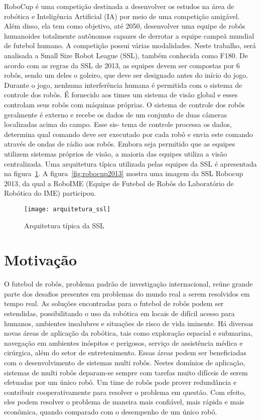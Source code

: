RoboCup é uma competição destinada a desenvolver os estudos na área de robótica
e Inteligência Artificial (IA) por meio de uma competição amigável. Além disso,
ela tem como objetivo, até 2050, desenvolver uma equipe de robôs humanoides
totalmente autônomos capazes de derrotar a equipe campeã mundial de futebol
humano. A competição possui várias modalidades. Neste trabalho, será analisada a
Small Size Robot League (SSL), também conhecida como F180. De acordo com as
regras da SSL de 2013, as equipes devem ser compostas por 6 robôs, sendo um deles o
goleiro, que deve ser designado antes do início do jogo. Durante o jogo, nenhuma
interferência humana é permitida com o sistema de controle dos robôs. É
fornecido aos times um sistema de visão global e esses controlam seus robôs com
máquinas próprias. O sistema de controle dos robôs geralmente é externo e recebe
os dados de um conjunto de duas câmeras localizadas acima do campo. Esse sis-
tema de controle processa os dados, determina qual comando deve ser executado
por cada robô e envia este comando através de ondas de rádio aos robôs. Embora
seja permitido que as equipes utilizem sistemas próprios de visão, a maioria das
equipes utiliza a visão centralizada. Uma arquitetura típica utilizada pelas
equipes da SSL é apresentada na figura~\ref{fig:arq_ssl}. A
figura~\ref{fig:robocup2013} mostra uma imagem da SSL Robocup 2013, da qual a
RoboIME (Equipe de Futebol de Robôs do Laboratório de Robótica do IME)
participou.

\begin{figure}
  \centering
  \texttt{[image: arquitetura\_ssl]}
  \caption{Arquitetura típica da SSL}\label{fig:arq_ssl}
\end{figure}

\section{Motivação}

O futebol de robôs, problema padrão de investigação internacional, reúne grande
parte dos desafios presentes em problemas do mundo real a serem resolvidos em
tempo real. As soluções encontradas para o futebol de robôs podem ser
estendidas, possibilitando o uso da robótica em locais de difícil acesso para
humanos, ambientes insalubres e situações de risco de vida iminente.  Há
diversas novas áreas de aplicação da robótica, tais como exploração espacial e
submarina, navegação em ambientes inóspitos e perigosos, serviço de assistência
médica e cirúrgica, além do setor de entretenimento. Essas áreas podem ser
beneficiadas com o desenvolvimento de sistemas multi robôs. Nestes domínios de
aplicação, sistemas de multi robôs deparam-se sempre com tarefas muito difíceis
de serem efetuadas por um único robô.  Um time de robôs pode prover redundância
e contribuir cooperativamente para resolver o problema em questão. Com efeito,
eles podem resolver o problema de maneira mais confiável, mais rápida e mais
econômica, quando comparado com o desempenho de um único robô.

